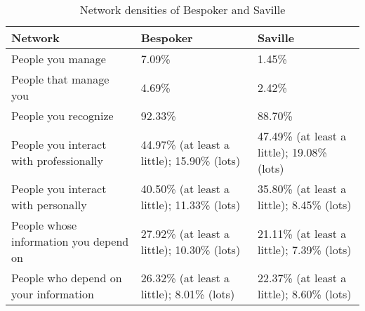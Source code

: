 \begin{table}[tph]
\caption{\label{tab:NetworkDensity} Network densities of Bespoker and Saville}
\centering
\footnotesize{\begin{tabular}{p{5.6cm}p{4.0cm}p{4.0cm}}
\hline \hline
\vspace{1pt} \bfseries Network & \vspace{1pt} \bfseries Bespoker & \vspace{1pt} \bfseries Saville \\
\hline
\vspace{0.5pt} People you manage & \vspace{0.5pt} 7.09\% & \vspace{0.5pt} 1.45\% \\
\hline
\vspace{0.5pt} People that manage you & \vspace{0.5pt} 4.69\% & \vspace{0.5pt} 2.42\% \\
\hline
\vspace{0.5pt} People you recognize & \vspace{0.5pt} 92.33\% & \vspace{0.5pt} 88.70\% \\
\hline
\vspace{0.5pt} People you interact with professionally & \vspace{0.5pt} 44.97\% (at least a little); 15.90\% (lots) & \vspace{0.5pt} 47.49\% (at least a little); 19.08\% (lots) \\
\hline
\vspace{0.5pt} People you interact with personally & \vspace{0.5pt} 40.50\% (at least a little); 11.33\% (lots) & \vspace{0.5pt} 35.80\% (at least a little); 8.45\% (lots) \\
\hline
\vspace{0.5pt} People whose information you depend on & \vspace{0.5pt} 27.92\% (at least a little); 10.30\% (lots) & \vspace{0.5pt} 21.11\% (at least a little); 7.39\% (lots) \\
\hline
\vspace{0.5pt} People who depend on your information & \vspace{0.5pt} 26.32\% (at least a little); 8.01\% (lots) & \vspace{0.5pt} 22.37\% (at least a little); 8.60\% (lots) \\
\hline
\end{tabular}}
\end{table}

